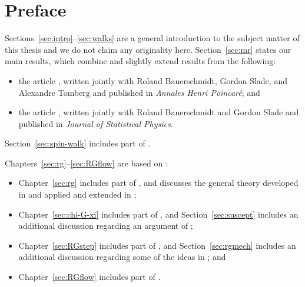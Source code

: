\cleardoublepage

\chapter{Preface}

Sections~\ref{sec:intro}--\ref{sec:walks} are a general introduction to the
subject matter of this thesis and we do not claim any originality here. Section~\ref{sec:mr}
states our main results, which combine and slightly extend results from the following:
\begin{itemize}
\item
the article \cite{BSTW-clp}, written jointly with
Roland Bauerschmidt, Gordon Slade, and Alexandre Tomberg and
published in \textit{Annales Henri Poincar\'{e}};
and

\item
the article \cite{BSW-saw-sa}, written jointly with
Roland Bauerschmidt and Gordon Slade and published
in \textit{Journal of Statistical Physics}.
\end{itemize}
Section~\ref{sec:spin-walk} includes part of \cite{BSW-saw-sa}.

Chapters~\ref{sec:rg}--\ref{sec:RGflow} are based on \cite{BSTW-clp,BSW-saw-sa}:
\begin{itemize}
\item
Chapter~\ref{sec:rg} includes part of \cite{BSTW-clp,BSW-saw-sa},
and discusses the general theory developed in
\cite{BS-rg-norm,BS-rg-loc,BBS-rg-pt,BS-rg-IE,BS-rg-step}
and applied and extended in
\cite{BBS-saw4-log,BBS-saw4,ST-phi4};

\item
Chapter~\ref{sec:chi-G-xi} includes part of \cite{BSTW-clp,BSW-saw-sa},
and Section~\ref{sec:suscept} includes an additional discussion regarding an argument
of \cite{BBS-saw4-log};

\item
Chapter~\ref{sec:RGstep} includes part of \cite{BSTW-clp}, and
Section~\ref{sec:rgmech} includes an additional discussion regarding some of the ideas in
\cite{BS-rg-step}; and

\item
Chapter~\ref{sec:RGflow} includes part of \cite{BSW-saw-sa}.
\end{itemize}




